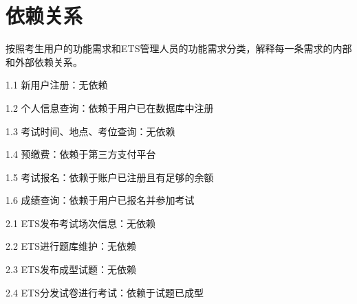 \chapter{依赖关系}
按照考生用户的功能需求和ETS管理人员的功能需求分类，解释每一条需求的内部和外部依赖关系。

1.1 新用户注册：无依赖

1.2 个人信息查询：依赖于用户已在数据库中注册

1.3 考试时间、地点、考位查询：无依赖

1.4 预缴费：依赖于第三方支付平台

1.5 考试报名：依赖于账户已注册且有足够的余额

1.6 成绩查询：依赖于用户已报名并参加考试

2.1 ETS发布考试场次信息：无依赖

2.2 ETS进行题库维护：无依赖

2.3 ETS发布成型试题：无依赖

2.4 ETS分发试卷进行考试：依赖于试题已成型
